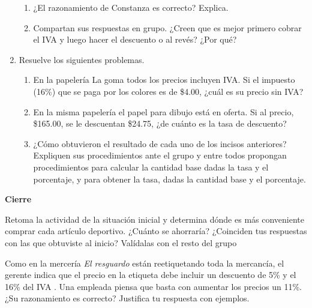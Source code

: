 \documentclass[11pt]{book}
\begin{document}
\begin{enumerate}
        \begin{enumerate}
          \item ¿El razonamiento de Constanza es correcto? Explica.
          \item Compartan sus respuestas en grupo. ¿Creen que es mejor primero cobrar el IVA y
                luego hacer el descuento o al revés? ¿Por qué?
        \end{enumerate}
  \item Resuelve los siguientes problemas.
        \begin{enumerate}
          \item En la papelería La goma todos los precios incluyen IVA. Si el impuesto
                (16\%) que se paga por los colores es de \$4.00, ¿cuál es su precio sin IVA?
          \item En la misma papelería el papel para dibujo está en oferta. Si al precio,
                \$165.00, se le descuentan \$24.75, ¿de cuánto es la tasa de descuento?

          \item ¿Cómo obtuvieron el resultado de cada uno de los incisos anteriores? Expliquen
                sus procedimientos ante el grupo y entre todos propongan procedimientos para
                calcular la cantidad base dadas la tasa y el porcentaje, y para obtener la tasa,
                dadas la cantidad base y el porcentaje.
        \end{enumerate}
\end{enumerate}

\begin{boxK}
  \begin{center}\textbf{Cierre}\end{center}

  Retoma la actividad de la situación inicial y determina dónde es más conveniente
  comprar cada artículo deportivo. ¿Cuánto se ahorraría? ¿Coinciden tus
  respuestas con las que obtuviste al inicio? Valídalas con el resto del grupo
\end{boxK}

\begin{boxH}
  Como en la mercería \emph{El resguardo} están reetiquetando toda la mercancía, el gerente
  indica que el precio en la etiqueta debe incluir un descuento de 5\% y el 16\%
  del IVA . Una empleada piensa que basta con aumentar los precios un 11\%. ¿Su razonamiento
  es correcto? Justifica tu respuesta con ejemplos.
\end{boxH}
\end{document}
